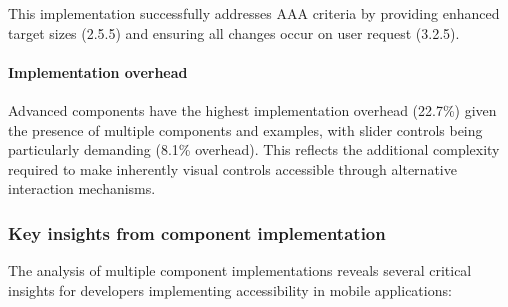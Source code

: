 This implementation successfully addresses AAA criteria by providing enhanced target sizes (2.5.5) and ensuring all changes occur on user request (3.2.5).

\paragraph{Implementation overhead}

Advanced components have the highest implementation overhead (22.7\%) given the presence of multiple components and examples, with slider controls being particularly demanding (8.1\% overhead). This reflects the additional complexity required to make inherently visual controls accessible through alternative interaction mechanisms.

\subsubsection{Key insights from component implementation}
\label{subsubsec:component-insights}

The analysis of multiple component implementations reveals several critical insights for developers implementing accessibility in mobile applications:

